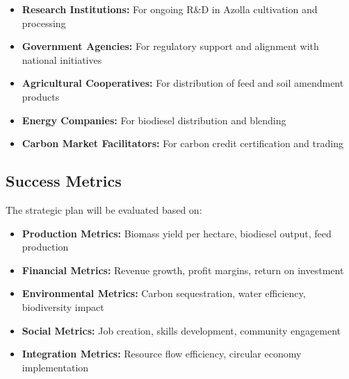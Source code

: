 \begin{itemize}
    \item \textbf{Research Institutions:} For ongoing R\&D in Azolla cultivation and processing
    \item \textbf{Government Agencies:} For regulatory support and alignment with national initiatives
    \item \textbf{Agricultural Cooperatives:} For distribution of feed and soil amendment products
    \item \textbf{Energy Companies:} For biodiesel distribution and blending
    \item \textbf{Carbon Market Facilitators:} For carbon credit certification and trading
\end{itemize}

\subsection{Success Metrics}

The strategic plan will be evaluated based on:

\begin{itemize}
    \item \textbf{Production Metrics:} Biomass yield per hectare, biodiesel output, feed production
    \item \textbf{Financial Metrics:} Revenue growth, profit margins, return on investment
    \item \textbf{Environmental Metrics:} Carbon sequestration, water efficiency, biodiversity impact
    \item \textbf{Social Metrics:} Job creation, skills development, community engagement
    \item \textbf{Integration Metrics:} Resource flow efficiency, circular economy implementation
\end{itemize}

